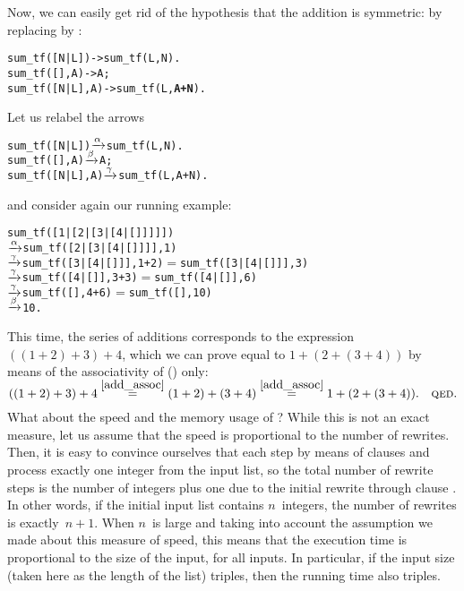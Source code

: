 Now, we can easily get rid of the hypothesis that the addition is
symmetric: by replacing  by
:\label{code:sum_tf}
\begin{alltt}
sum_tf([N|L])   -> sum_tf(L,N).
sum_tf(   [],A) -> A;
sum_tf([N|L],A) -> sum_tf(L,\textbf{A+N}).
\end{alltt}
Let us relabel the arrows
\begin{alltt}
sum_tf([N|L])   \(\xrightarrow{\smash[t]{\alpha}}\) sum_tf(L,N).
sum_tf(   [],A) \(\xrightarrow{\smash[t]{\beta}}\) A;
sum_tf([N|L],A) \(\xrightarrow{\smash[t]{\gamma}}\) sum_tf(L,A+N).
\end{alltt}
and consider again our running example:
\begin{alltt}
sum\_tf([1|[2|[3|[4|[]]]]])
          \(\xrightarrow{\smash[t]{\alpha}}\) sum\_tf([2|[3|[4|[]]]],1)
          \(\xrightarrow{\smash[t]{\gamma}}\) sum\_tf([3|[4|[]]],1+2) \(=\) sum\_tf([3|[4|[]]],3)
          \(\xrightarrow{\smash[t]{\gamma}}\) sum\_tf([4|[]],3+3)     \(=\) sum\_tf([4|[]],6)
          \(\xrightarrow{\smash[t]{\gamma}}\) sum\_tf([],4+6)         \(=\) sum\_tf([],10)
          \(\xrightarrow{\smash[t]{\beta}}\)  10\textrm{.}
\end{alltt}
This time, the series of additions corresponds to the expression
\(((1+2)+3)+4\), which we can prove equal to \(1+(2+(3+4))\) by means
of the associativity of (\erlcode{+}) only:
\begin{equation*}
((1 + 2) + 3) + 4
  \mathrel{\smash{\stackrel{\ref{add_assoc}}{=}}} (1 + 2) + (3 + 4)
  \mathrel{\smash{\stackrel{\ref{add_assoc}}{=}}} 1 + (2 + (3 + 4)).\quad \text{\textsc{qed}.}
\end{equation*}
What about the speed and the memory usage of ?
While this is not an exact measure, let us assume that the speed is
proportional to the number of rewrites. Then, it is easy to convince
ourselves that each step by means of clauses \clause{\beta} and
\clause{\gamma} process exactly one integer from the input list, so
the total number of rewrite steps is the number of integers plus one
due to the initial rewrite through clause \clause{\alpha}. In other
words, if the initial input list contains \(n\)~integers, the number
of rewrites is exactly~\(n+1\). When \(n\)~is large and taking into
account the assumption we made about this measure of speed, this means
that the execution time is proportional to the size of the input, for
all inputs. In particular, if the input size (taken here as the length
of the list) triples, then the running time also triples.


